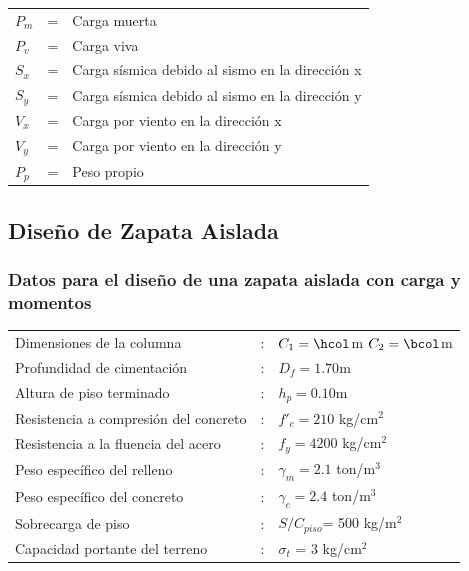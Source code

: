 \documentclass{article}%
\begin{document}
\begin{table}[h!]
    \centering
    \begin{tabular}{lll}
        $P_m$ &=&   Carga muerta\\
        $P_v$ &=&   Carga viva\\
        $S_x$ &=&   Carga sísmica debido al sismo en la dirección x\\
        $S_y$ &=&   Carga sísmica debido al sismo en la dirección y\\
        $V_x$ &=&   Carga por viento en la dirección x\\
        $V_y$ &=&   Carga por viento en la dirección y\\
        $P_p$ &=&   Peso propio\\
    \end{tabular}
\end{table}

%
\subsection{Diseño de Zapata Aislada}%
\label{subsec:DiseodeZapataAislada}%
\FPset{}
\FPset{}
%
\subsubsection{Datos para el diseño de una zapata aislada con carga y momentos}

\begin{table}[h!]
    \centering

    \begin{tabular}{lcl} %
        Dimensiones de la columna               &:& $C_1        = \hcol$m \quad $C_2 = \bcol$m\\
        Profundidad de cimentación              &:& $D_f        = 1.70 $m\\
        Altura de piso terminado                &:& $h_p        = 0.10$m\\
        Resistencia a compresión del concreto   &:& $f'_c       = 210$ kg/cm$^2$ \\
        Resistencia a la fluencia del acero     &:& $f_y        = 4200$ kg/cm$^2$ \\
        Peso específico del relleno             &:& $\gamma_m   = 2.1$ ton/m$^3$ \\
        Peso específico del concreto            &:& $\gamma_c   = 2.4$ ton/m$^3$ \\
        Sobrecarga de piso                      &:& $S/C_{piso}$= 500 kg/m$^2$ \\ 
        Capacidad portante del terreno          &:& $\sigma_t$  = 3 kg/cm$^2$  \\ %
        
    \end{tabular}
\end{table}
\end{document}

